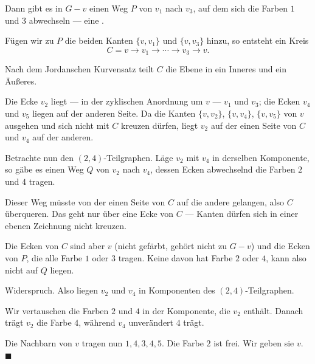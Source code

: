 \begin{merksatz}
Dann gibt es in $G-v$ einen Weg $P$ von $v_1$ nach $v_3$, auf dem sich die Farben $1$ und $3$ abwechseln --- eine .

Fügen wir zu $P$ die beiden Kanten $\{v, v_1\}$ und $\{v, v_3\}$ hinzu, so entsteht ein Kreis
\[ C = v \to v_1 \to \cdots \to v_3 \to v . \]

\begin{center}
\end{center}

Nach dem Jordanschen Kurvensatz teilt $C$ die Ebene in ein Inneres und ein Äußeres.

Die Ecke $v_2$ liegt --- in der zyklischen Anordnung um $v$ ---  $v_1$ und $v_3$; die Ecken $v_4$ und $v_5$ liegen auf der anderen Seite. Da die Kanten $\{v,v_2\}$, $\{v,v_4\}$, $\{v,v_5\}$ von $v$ ausgehen und sich nicht mit $C$ kreuzen dürfen, liegt $v_2$ auf der einen Seite von $C$ und $v_4$ auf der anderen.

Betrachte nun den $(2,4)$-Teilgraphen. Läge $v_2$ mit $v_4$ in derselben Komponente, so gäbe es einen Weg $Q$ von $v_2$ nach $v_4$, dessen Ecken abwechselnd die Farben $2$ und $4$ tragen.

Dieser Weg müsste von der einen Seite von $C$ auf die andere gelangen, also $C$ überqueren. Das geht nur über eine Ecke von $C$ --- Kanten dürfen sich in einer ebenen Zeichnung nicht kreuzen.

Die Ecken von $C$ sind aber $v$ (nicht gefärbt, gehört nicht zu $G-v$) und die Ecken von $P$, die alle Farbe $1$ oder $3$ tragen. Keine davon hat Farbe $2$ oder $4$, kann also nicht auf $Q$ liegen.

Widerspruch. Also liegen $v_2$ und $v_4$ in  Komponenten des $(2,4)$-Teilgraphen.

Wir vertauschen die Farben $2$ und $4$ in der Komponente, die $v_2$ enthält. Danach trägt $v_2$ die Farbe $4$, während $v_4$ unverändert $4$ trägt.

Die Nachbarn von $v$ tragen nun $1, 4, 3, 4, 5$. Die Farbe $2$ ist frei. Wir geben sie $v$. $\blacksquare$
\end{merksatz}

